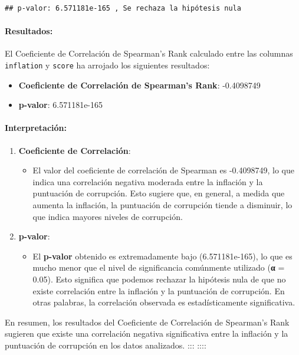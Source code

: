\documentclass[
]{article}
\providecommand{\tightlist}{%
  \setlength{\itemsep}{0pt}\setlength{\parskip}{0pt}}
\begin{document}
\begin{verbatim}
## p-valor: 6.571181e-165 , Se rechaza la hipótesis nula
\end{verbatim}

\paragraph{Resultados:}\label{resultados}

El Coeficiente de Correlación de Spearman's Rank calculado entre las
columnas \texttt{inflation} y \texttt{score} ha arrojado los siguientes
resultados:

\begin{itemize}
\tightlist
\item
  \textbf{Coeficiente de Correlación de Spearman's Rank}: -0.4098749
\item
  \textbf{p-valor}: 6.571181e-165
\end{itemize}

\paragraph{Interpretación:}\label{interpretacion}

\begin{enumerate}
\def\labelenumi{\arabic{enumi}.}
\tightlist
\item
  \textbf{Coeficiente de Correlación}:

  \begin{itemize}
  \tightlist
  \item
    El valor del coeficiente de correlación de Spearman es -0.4098749,
    lo que indica una correlación negativa moderada entre la inflación y
    la puntuación de corrupción. Esto sugiere que, en general, a medida
    que aumenta la inflación, la puntuación de corrupción tiende a
    disminuir, lo que indica mayores niveles de corrupción.
  \end{itemize}
\item
  \textbf{p-valor}:

  \begin{itemize}
  \tightlist
  \item
    El \textbf{p-valor} obtenido es extremadamente bajo (6.571181e-165),
    lo que es mucho menor que el nivel de significancia comúnmente
    utilizado (\textbf{α} = 0.05). Esto significa que podemos rechazar
    la hipótesis nula de que no existe correlación entre la inflación y
    la puntuación de corrupción. En otras palabras, la correlación
    observada es estadísticamente significativa.
  \end{itemize}
\end{enumerate}

En resumen, los resultados del Coeficiente de Correlación de Spearman's
Rank sugieren que existe una correlación negativa significativa entre la
inflación y la puntuación de corrupción en los datos analizados. :::
::::
\end{document}
